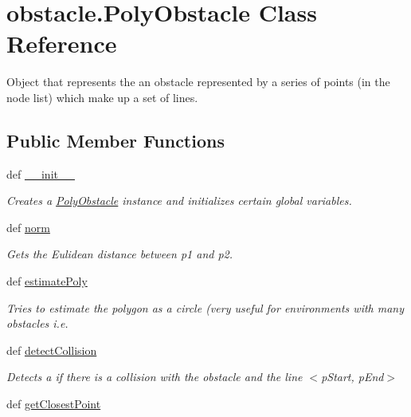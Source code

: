 \hypertarget{classobstacle_1_1PolyObstacle}{\section{obstacle.\-Poly\-Obstacle Class Reference}
\label{classobstacle_1_1PolyObstacle}
}


Object that represents the an obstacle represented by a series of points (in the node list) which make up a set of lines.  


\subsection*{Public Member Functions}
\begin{DoxyCompactItemize}
\item 
def \hyperlink{classobstacle_1_1PolyObstacle_aa92e181aa910e2cd8c110047fe10dc83}{\-\_\-\-\_\-init\-\_\-\-\_\-}
\begin{DoxyCompactList}\small\item\em Creates a \hyperlink{classobstacle_1_1PolyObstacle}{Poly\-Obstacle} instance and initializes certain global variables. \end{DoxyCompactList}\item 
def \hyperlink{classobstacle_1_1PolyObstacle_a3392ccb4d22e752b0f150af354b16862}{norm}
\begin{DoxyCompactList}\small\item\em Gets the Eulidean distance between p1 and p2. \end{DoxyCompactList}\item 
def \hyperlink{classobstacle_1_1PolyObstacle_ab2833da8e0c16a191ae373af40a75b46}{estimate\-Poly}
\begin{DoxyCompactList}\small\item\em Tries to estimate the polygon as a circle (very useful for environments with many obstacles i.\-e. \end{DoxyCompactList}\item 
def \hyperlink{classobstacle_1_1PolyObstacle_a2a3283cffb3239c8777b85a83af5ee8c}{detect\-Collision}
\begin{DoxyCompactList}\small\item\em Detects a if there is a collision with the obstacle and the line $<$p\-Start, p\-End$>$ \end{DoxyCompactList}\item 
def \hyperlink{classobstacle_1_1PolyObstacle_a43adce887280997dfb49067e741f54db}{get\-Closest\-Point}

\end{DoxyCompactItemize}
